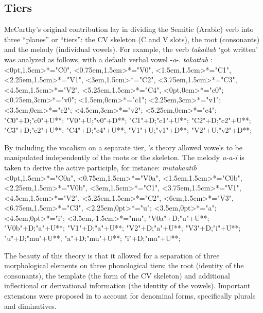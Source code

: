 	\subsection{Tiers}
McCarthy's original contribution lay in dividing the Semitic (Arabic) verb into three ``planes'' or ``tiers'': the CV skeleton (C and V slots), the root (consonants) and the melody (individual vowels). For example, the verb \emph{takattab} `got written' was analyzed as follows, with a default verbal vowel -\emph{a}-.
\ex\label{ex:jjmcc-takattab}\emph{takattab} \citep[392]{jjmcc81}:\\
\xy
<0pt,1.5cm>*="C0",
<0.75em,1.5cm>*="V0",
<1.5em,1.5cm>*="C1",
<2.25em,1.5cm>*="V1",
<3em,1.5cm>*="C2",
<3.75em,1.5cm>*="C3",
<4.5em,1.5cm>*="V2",
<5.25em,1.5cm>*="C4",
<0pt,0cm>*="c0";
<0.75em,3cm>*="v0";
<1.5em,0cm>*="c1";
<2.25em,3cm>*="v1";
<3.5em,0cm>*="c2";
<4.5em,3cm>*="v2";
<5.25em,0cm>*="c4";
"C0"+D;"c0"+U**\dir{-};
"V0"+U;"v0"+D**\dir{-};
"C1"+D;"c1"+U**\dir{-};
"C2"+D;"c2"+U**\dir{-};
"C3"+D;"c2"+U**\dir{-};
"C4"+D;"c4"+U**\dir{-};
"V1"+U;"v1"+D**\dir{-};
"V2"+U;"v2"+D**\dir{-};
\endxy
\xe

By including the vocalism on a separate tier, \citeauthor{jjmcc81}'s theory allowed vowels to be manipulated independently of the roots or the skeleton. The melody \emph{u-a-i} is taken to derive the active participle, for {instance}:
\ex \emph{mutakaatib} \citep[401]{jjmcc81}\\
\xy
<0pt,1.5cm>*="C0a",
<0.75em,1.5cm>*="V0a",
<1.5em,1.5cm>*="C0b",
<2.25em,1.5cm>*="V0b",
<3em,1.5cm>*="C1",
<3.75em,1.5cm>*="V1",
<4.5em,1.5cm>*="V2",
<5.25em,1.5cm>*="C2",
<6em,1.5cm>*="V3",
<6.75em,1.5cm>*="C3",
<2.25em,0pt>*="u";
<3.5em,0pt>*="a";
<4.5em,0pt>*="i";
<3.5em,-1.5cm>*\asrnode{$\mu$}="mu";
"V0a"+D;"u"+U**\dir{-};
"V0b"+D;"a"+U**\dir{-};
"V1"+D;"a"+U**\dir{-};
"V2"+D;"a"+U**\dir{-};
"V3"+D;"i"+U**\dir{-};
"u"+D;"mu"+U**\dir{-};
"a"+D;"mu"+U**\dir{-};
"i"+D;"mu"+U**\dir{-};
\endxy
\xe

The beauty of this theory is that it allowed for a separation of three morphological elements on three phonological tiers: the root (identity of the consonants), the template (the form of the CV skeleton) and additional inflectional or derivational information (the identity of the vowels). Important extensions were proposed in \cite{jjmccprince90} to account for denominal forms, specifically plurals and diminutives.

